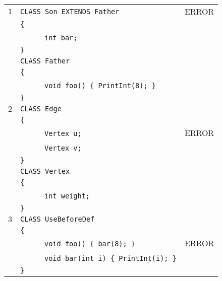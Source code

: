 \documentclass{article}
\begin{document}
\begin{table}[h]
\centering
\begin{tabular}{|l|l|l|}
\hline
 $1$ & \verb"CLASS Son EXTENDS Father"           & ERROR \\
     & \verb"{"                                  &       \\
     & ~ ~ ~ ~\verb"int bar;"                    &       \\
     & \verb"}"                                  &       \\
     & \verb"CLASS Father"                       &       \\
     & \verb"{"                                  &       \\
     & ~ ~ ~ ~\verb"void foo() { PrintInt(8); }" &       \\
     & \verb"}"                                  &       \\
\hline
 $2$ & \verb"CLASS Edge"                         &       \\
     & \verb"{"                                  &       \\
     & ~ ~ ~ ~\verb"Vertex u;"                   & ERROR \\
     & ~ ~ ~ ~\verb"Vertex v;"                   &       \\
     & \verb"}"                                  &       \\
     & \verb"CLASS Vertex"                       &       \\
     & \verb"{"                                  &       \\
     & ~ ~ ~ ~\verb"int weight;"                 &       \\
     & \verb"}"                                  &       \\
\hline
 $3$ & \verb"CLASS UseBeforeDef"                      &       \\
     & \verb"{"                                       &       \\
     & ~ ~ ~ ~\verb"void foo() { bar(8); }"           & ERROR \\
     & ~ ~ ~ ~\verb"void bar(int i) { PrintInt(i); }" &       \\
     & \verb"}"                                       &       \\

\end{tabular}
\end{table}
\end{document}
